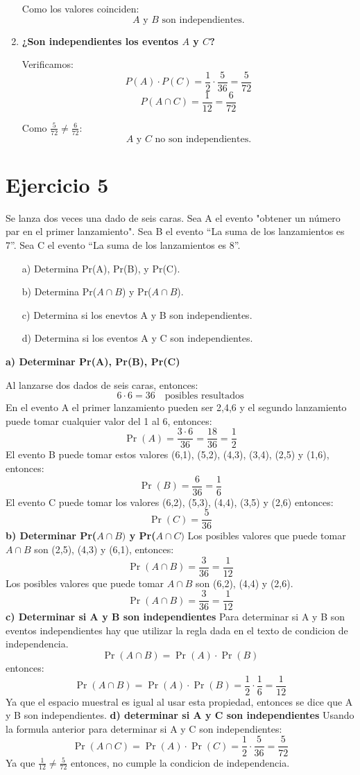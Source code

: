 \documentclass{article}
\begin{document}
\begin{enumerate}[label=\alph*)]
    Como los valores coinciden:  
    \[
    \boxed{A \text{ y } B \text{ son independientes.}}
    \]

    \item \textbf{¿Son independientes los eventos $A$ y $C$?}

    Verificamos:
    \[
    P(A) \cdot P(C) = \frac{1}{2} \cdot \frac{5}{36} = \frac{5}{72}
    \]
    \[
    P(A \cap C) = \frac{1}{12} = \frac{6}{72}
    \]

    Como $\frac{5}{72} \ne \frac{6}{72}$:
    \[
    \boxed{A \text{ y } C \text{ no son independientes.}}
    \]
\end{enumerate}

\section*{Ejercicio 5}
Se lanza dos veces una dado de seis caras. Sea A el evento "obtener un número par en el primer lanzamiento". Sea B el evento ``La suma de los lanzamientos es 7''. Sea C el evento ``La suma de los lanzamientos es 8''.
\begin{enumerate}
    \item[a)] Determina Pr(A), Pr(B), y Pr(C).
    \item[b)] Determina Pr(\(A \cap B\)) y Pr(\(A \cap B\)).
    \item[c)] Determina si los enevtos A y B son independientes.
    \item[d)] Determina si los eventos A y C son independientes.
\end{enumerate}

\textbf{a) Determinar Pr(A), Pr(B), Pr(C)}

Al lanzarse dos dados de seis caras, entonces:
\[
6\cdot 6 = 36 \quad\text{posibles resultados}
\]
En el evento A el primer lanzamiento pueden ser 2,4,6 y el segundo lanzamiento puede tomar cualquier valor del 1 al 6, entonces:
\[
\Pr(A)=\frac{3\cdot6}{36} = \frac{18}{36} = \frac{1}{2} 
\]
El evento B puede tomar estos valores (6,1), (5,2), (4,3), (3,4), (2,5) y (1,6), entonces:
\[
\Pr(B) = \frac{6}{36} = \frac{1}{6}
\]
El evento C puede tomar los valores (6,2), (5,3), (4,4), (3,5) y (2,6) entonces:
\[
\Pr(C) = \frac{5}{36}
\]
\textbf{b) Determinar Pr(\(A\cap B)\) y Pr(\(A\cap C)\)}
Los posibles valores que puede tomar \(A\cap B\) son (2,5), (4,3) y (6,1), entonces:
\[
\Pr(A\cap B)= \frac{3}{36} = \frac{1}{12}
\]
Los posibles valores que puede tomar \(A\cap B\) son (6,2), (4,4) y (2,6).
\[
\Pr(A\cap B) = \frac{3}{36} = \frac{1}{12}
\]
\textbf{c) Determinar si A y B son independientes}
Para determinar si A y B son eventos independientes hay que utilizar la regla dada en el texto de condicion de independencia.
\[
\Pr(A\cap B) = \Pr(A) \cdot \Pr(B)
\]
entonces:
\[
\Pr(A\cap B) = \Pr(A) \cdot \Pr(B) = \frac{1}{2}\cdot \frac{1}{6} = \frac{1}{12}
\]
Ya que el espacio muestral es igual al usar esta propiedad, entonces se dice que A y B son independientes.
\textbf{d) determinar si A y C son independientes}
Usando la formula anterior para determinar si A y C son independientes:
\[
\Pr(A\cap C) = \Pr(A) \cdot \Pr(C) = \frac{1}{2}\cdot \frac{5}{36} = \frac{5}{72}
\]
Ya que \(\frac{1}{12}\neq \frac{5}{72}\) entonces, no cumple la condicion de independencia.
\end{document}
